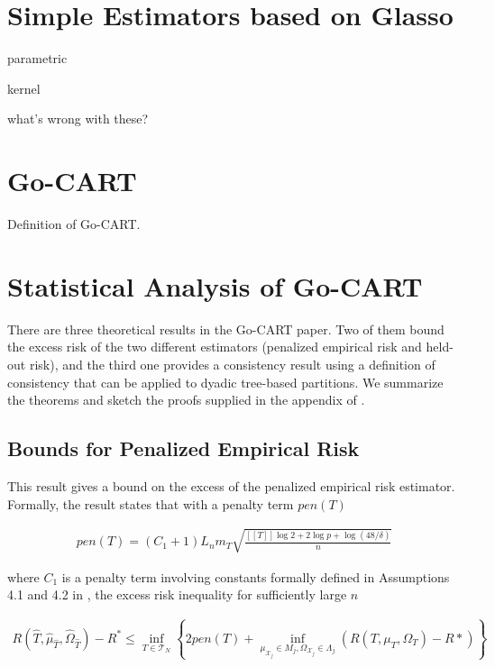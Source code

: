 \documentclass[12pt]{article}
\begin{document}
\section{Simple Estimators based on Glasso}

parametric

kernel

what's wrong with these?

\section{Go-CART}
Definition of Go-CART.

\section{Statistical Analysis of Go-CART}

There are three theoretical results in the Go-CART paper. Two of them bound the excess risk of the two different estimators (penalized empirical risk and held-out risk), and the third one provides a consistency result using a definition of consistency that can be applied to dyadic tree-based partitions. We summarize the theorems and sketch the proofs supplied in the appendix of \cite{liu2009}.

\subsection{Bounds for Penalized Empirical Risk}

This result gives a bound on the excess of the penalized empirical risk estimator. Formally, the result states that with a penalty term $pen(T)$

\begin{align}
    pen(T) = (C_1 + 1) L_n m_T
    \sqrt{
        \frac{[[T]] \log 2 + 2 \log p + \log(48/\delta)}
        {n}
    }
\end{align}

where $C_1$ is a penalty term involving constants formally defined in Assumptions 4.1 and 4.2 in \cite{liu2009}, the excess risk inequality for sufficiently large $n$

\begin{align}
    R(\hat{T}, \hat{\mu}_{\hat{T}}, \hat{\Omega}_{\hat{T}}) - R^*
    \le \underset{T \in \mathcal{T}_N}{\inf} \left\{
        2 pen(T)
        + \underset{\mu_{\mathcal{X}_j} \in M_j,\Omega_{\mathcal{X}_j} \in \Lambda_j}{\inf}
        (R(T, \mu_T, \Omega_T) - R*)
    \right\}
\end{align}
\end{document}
